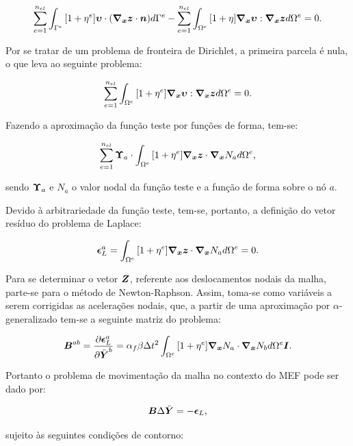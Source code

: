 \begin{equation}
    \sum_{e=1}^{n_{el}}{\int_{\Gamma^e}{[1+\eta^e]\boldsymbol{\upsilon}\cdot(\boldsymbol{\nabla_x}\boldsymbol{z}\cdot\boldsymbol{n}) d\Gamma^e}}-\sum_{e=1}^{n_{el}}{\int_{\Omega^e}{[1+\eta]\boldsymbol{\nabla_x}\boldsymbol{\upsilon}:\boldsymbol{\nabla_x}\boldsymbol{z} d\Omega^e}}=0\text{.}
\end{equation}

Por se tratar de um problema de fronteira de Dirichlet, a primeira parcela é nula, o que leva ao seguinte problema:

\begin{equation}
    \sum_{e=1}^{n_{el}}{\int_{\Omega^e}{[1+\eta^e]\boldsymbol{\nabla_x}\boldsymbol{\upsilon}:\boldsymbol{\nabla_x}\boldsymbol{z} d\Omega^e}}=0\text{.}
\end{equation}

Fazendo a aproximação da função teste por funções de forma, tem-se:

\begin{equation}
    \sum_{e=1}^{n_{el}}{\boldsymbol{\Upsilon}_a\cdot\int_{\Omega^e}{[1+\eta^e]\boldsymbol{\nabla_x}\boldsymbol{z}\cdot\boldsymbol{\nabla_x} N_a d\Omega^e}}\text{,}
\end{equation}

\noindent sendo $\boldsymbol{\Upsilon}_a$ e $N_a$ o valor nodal da função teste e a função de forma sobre o nó $a$.

Devido à arbitrariedade da função teste, tem-se, portanto, a definição do vetor resíduo do problema de Laplace:

\begin{equation}
    \boldsymbol{\epsilon}_L^a=\int_{\Omega^e}{[1+\eta^e]\boldsymbol{\nabla_x}\boldsymbol{z}\cdot\boldsymbol{\nabla_x} N_a d\Omega^e}=0\text{.}
    \label{eq:resLapl}
\end{equation}

Para se determinar o vetor $\boldsymbol{Z}$, referente aos deslocamentos nodais da malha, parte-se para o método de Newton-Raphson. Assim, toma-se como variáveis a serem corrigidas as acelerações nodais, que, a partir de uma aproximação por $\alpha$-generalizado tem-se a seguinte matriz do problema:

\begin{equation}
    \boldsymbol{B}^{ab}=\frac{\partial{\boldsymbol{\epsilon}_L^a}}{\partial{\ddot{\boldsymbol{Y}}^b}}=\alpha_f\beta\Delta t^2\int_{\Omega^e}{[1+\eta^e]\boldsymbol{\nabla_x} N_a\cdot\boldsymbol{\nabla_x} N_b d\Omega^e}\boldsymbol{I}\text{.}
    \label{eq:movMatriz}
\end{equation}

Portanto o problema de movimentação da malha no contexto do MEF pode ser dado por:

\begin{equation}
    \boldsymbol{B}\Delta\ddot{\boldsymbol{Y}}=-\boldsymbol{\epsilon}_L\text{,}
    \label{eq:sistLapl}
\end{equation}

\noindent sujeito às seguintes condições de contorno:


